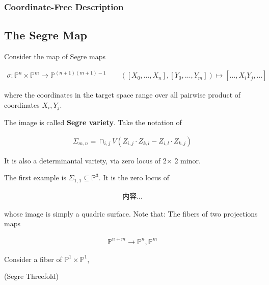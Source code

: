 \documentclass[Total.tex]{subfiles}
\begin{document}
				
				\subsubsection{Coordinate-Free Description}
				
			\subsection{The Segre Map}
			
				\begin{Def}
					\label{Classical-Algebraic-Geometry-Segre-Map}Consider the map of Segre maps
					
					\begin{gather*}
						\sigma:\mathbb{P}^n\times \mathbb{P}^m\rightarrow \mathbb{P}^{(n+1)(m+1)-1}\qquad ([X_0,\dots,X_n],[Y_0,\dots,Y_m])\mapsto [\dots,X_iY_j,\dots]
					\end{gather*}
					
					where the coordinates in the target space range over all pairwise product of coordinates $X_i,Y_j$. 
					
					The image is called \textbf{Segre variety}. Take the notation of 
					
					\begin{gather*}
						\Sigma_{m,n}=\cap_{i,j}V(Z_{i,j}\cdot Z_{k,l}-Z_{i,l}\cdot Z_{k,j})
					\end{gather*}
				\end{Def}
				
				It is also a determinantal variety, via zero locus of 2$\times$ 2 minor.
				
				\begin{example}
					The first example is $\Sigma_{1,1}\subseteq \mathbb{P}^3$. It is the zero locus of
					
					\begin{gather*}
						内容...
					\end{gather*}
					
					whose image is simply a quadric surface. Note that: The fibers of two projections maps
					
					\begin{gather*}
						\mathbb{P}^{n+m}\rightarrow \mathbb{P}^n,\mathbb{P}^m
					\end{gather*} 
					
					Consider a fiber of $\mathbb{P}^1\times \mathbb{P}^1$, 
				\end{example}
				
				\begin{example}
					(Segre Threefold)
				\end{example}
				
\end{document}
